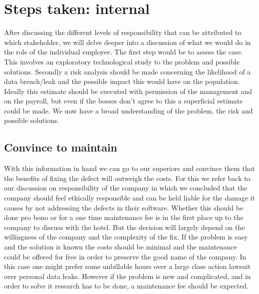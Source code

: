 \section{Steps taken: internal}
After discussing the different levels of responsibility that can be attributed to which stakeholder, we will delve deeper into a discussion of what we would do in the role of the individual employee. The first step would be to assess the case. This involves an exploratory technological study to the problem and possible solutions. Secondly a risk analysis should be made concerning the likelihood of a data breach/leak and the possible impact this would have on the population. Ideally this estimate should be executed with permission of the management and on the payroll, but even if the bosses don't agree to this a superficial estimate could be made. We now have a broad understanding of the problem, the risk and possible solutions. 

\subsection*{Convince to maintain}
With this information in hand we can go to our superiors and convince them that the benefits of fixing the defect will outweigh the costs. For this we refer back to our discussion on responsibility of the company in which we concluded that the company should feel ethically responsible and can be held liable for the damage it causes by not addressing the defects in their software. Whether this should be done pro bono or for a one time maintenance fee is in the first place up to the company to discuss with the hotel. But the decision will largely depend on the willingness of the company and the complexity of the fix. If the problem is easy and the solution is known the costs should be minimal and the maintenance could be offered for free in order to preserve the good name of the company. In this case one might prefer some unbillable hours over a large class action lawsuit over personal data leaks. However if the problem is new and complicated, and in order to solve it research has to be done, a maintenance fee should be expected.

